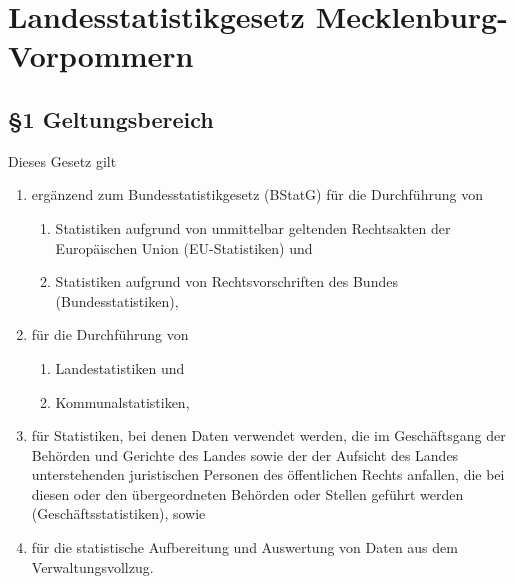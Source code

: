 \chapter[LStatGMV]{Landesstatistikgesetz Mecklenburg-Vorpommern}
\minitoc
    \section{\S1 Geltungsbereich}
    Dieses Gesetz gilt
    \begin{enumerate}[label=\arabic*.]
        \item ergänzend zum Bundesstatistikgesetz (BStatG) für die Durchführung von
            \begin{enumerate}[label=\alph*)]
                \item Statistiken aufgrund von unmittelbar geltenden Rechtsakten der Europäischen Union (EU-Statistiken) und
                \item Statistiken aufgrund von Rechtsvorschriften des Bundes (Bundesstatistiken),
            \end{enumerate}
        \item für die Durchführung von
            \begin{enumerate}[label=\alph*)]
                \item Landestatistiken und
                \item Kommunalstatistiken,
            \end{enumerate}
        \item für Statistiken, bei denen Daten verwendet werden, die im Geschäftsgang der Behörden und Gerichte des Landes sowie der der Aufsicht des Landes unterstehenden juristischen Personen des öffentlichen Rechts anfallen, die bei diesen oder den übergeordneten Behörden oder Stellen geführt werden (Geschäftsstatistiken), sowie
        \item für die statistische Aufbereitung und Auswertung von Daten aus dem Verwaltungsvollzug.
    \end{enumerate}


